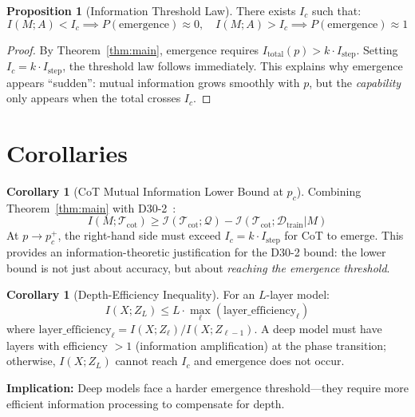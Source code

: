 \documentclass[12pt]{article}
\theoremstyle{definition}
\newtheorem{corollary}[definition]{Corollary}
\newtheorem{proposition}[definition]{Proposition}
\theoremstyle{remark}
\begin{document}
\begin{proposition}[Information Threshold Law]\label{prop:threshold}
There exists $I_c$ such that:
\begin{equation}
I(M; A) < I_c \implies P(\text{emergence}) \approx 0, \quad I(M; A) > I_c \implies P(\text{emergence}) \approx 1
\end{equation}
\end{proposition}

\begin{proof}
By Theorem~\ref{thm:main}, emergence requires $I_{\mathrm{total}}(p) > k \cdot I_{\mathrm{step}}$. Setting $I_c = k \cdot I_{\mathrm{step}}$, the threshold law follows immediately. This explains why emergence appears ``sudden'': mutual information grows smoothly with $p$, but the \emph{capability} only appears when the total crosses $I_c$.
\end{proof}

\section{Corollaries}

\begin{corollary}[CoT Mutual Information Lower Bound at $p_c$]\label{cor:cot}
Combining Theorem~\ref{thm:main} with D30-2~\cite{lu2026-d30-2}:
\begin{equation}
I(M; \mathcal{T}_{\mathrm{cot}}) \geq \mathcal{I}(\mathcal{T}_{\mathrm{cot}}; \mathcal{Q}) - \mathcal{I}(\mathcal{T}_{\mathrm{cot}}; \mathcal{D}_{\mathrm{train}} | M)
\end{equation}
At $p \to p_c^+$, the right-hand side must exceed $I_c = k \cdot I_{\mathrm{step}}$ for CoT to emerge. This provides an information-theoretic justification for the D30-2 bound: the lower bound is not just about accuracy, but about \emph{reaching the emergence threshold}.
\end{corollary}

\begin{corollary}[Depth-Efficiency Inequality]\label{cor:depth}
For an $L$-layer model:
\begin{equation}
I(X; Z_L) \leq L \cdot \max_{\ell} (\text{layer\_efficiency}_\ell)
\end{equation}
where $\text{layer\_efficiency}_\ell = I(X; Z_\ell) / I(X; Z_{\ell-1})$. A deep model must have layers with efficiency $> 1$ (information amplification) at the phase transition; otherwise, $I(X; Z_L)$ cannot reach $I_c$ and emergence does not occur.

\textbf{Implication:} Deep models face a harder emergence threshold---they require more efficient information processing to compensate for depth.
\end{corollary}
\end{document}
